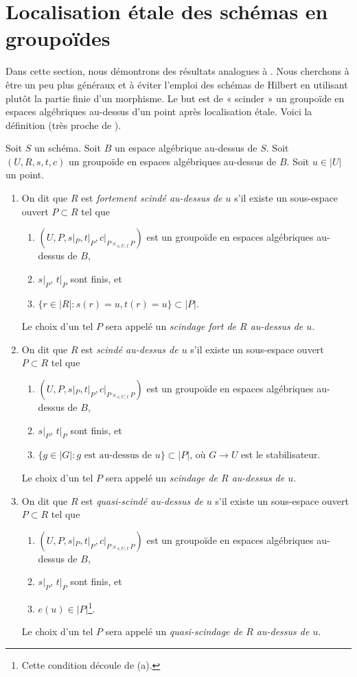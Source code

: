 \section{Localisation \'etale des schémas en groupoïdes}
\label{section-etale-localize}

\noindent
Dans cette section, nous démontrons des résultats analogues à
\cite[Proposition 4.2]{K-M}. Nous cherchons à être un peu plus généraux et
à éviter l'emploi des schémas de Hilbert en utilisant plutôt la partie finie
d'un morphisme. Le but est de « scinder » un groupoïde en espaces algébriques
au-dessus d'un point après localisation \'etale. Voici la définition
(très proche de \cite[définition 4.1]{K-M}).

\begin{definition}
\label{definition-split-at-point}
Soit $S$ un schéma. Soit $B$ un espace algébrique au-dessus de $S$.
Soit $(U, R, s, t, c)$ un groupoïde en espaces algébriques au-dessus de $B$.
Soit $u \in |U|$ un point.
\begin{enumerate}
\item On dit que $R$ est {\it fortement scindé au-dessus de $u$} s'il existe
un sous-espace ouvert $P \subset R$ tel que
\begin{enumerate}
\item $(U, P, s|_P, t|_P, c|_{P \times_{s, U, t} P})$ est un
groupoïde en espaces algébriques au-dessus de $B$,
\item $s|_P$, $t|_P$ sont finis, et
\item $\{r \in |R| : s(r) = u, t(r) = u\} \subset |P|$.
\end{enumerate}
Le choix d'un tel $P$ sera appelé un
{\it scindage fort de $R$ au-dessus de $u$}.
\item On dit que $R$ est {\it scindé au-dessus de $u$} s'il existe un
sous-espace ouvert $P \subset R$ tel que
\begin{enumerate}
\item $(U, P, s|_P, t|_P, c|_{P \times_{s, U, t} P})$ est un
groupoïde en espaces algébriques au-dessus de $B$,
\item $s|_P$, $t|_P$ sont finis, et
\item $\{g \in |G| : g\text{ est au-dessus de }u\} \subset |P|$, où
$G \to U$ est le stabilisateur.
\end{enumerate}
Le choix d'un tel $P$ sera appelé un
{\it scindage de $R$ au-dessus de $u$}.
\item On dit que $R$ est {\it quasi-scindé au-dessus de $u$} s'il existe
un sous-espace ouvert $P \subset R$ tel que
\begin{enumerate}
\item $(U, P, s|_P, t|_P, c|_{P \times_{s, U, t} P})$ est un
groupoïde en espaces algébriques au-dessus de $B$,
\item $s|_P$, $t|_P$ sont finis, et
\item $e(u) \in |P|$\footnote{Cette condition découle de (a).}.
\end{enumerate}
Le choix d'un tel $P$ sera appelé un {\it quasi-scindage de $R$ au-dessus de $u$}.
\end{enumerate}
\end{definition}

